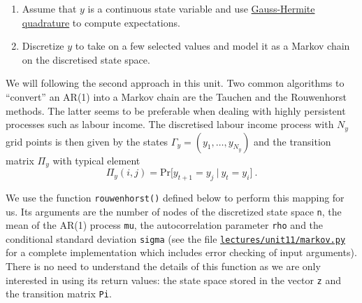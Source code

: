 \documentclass{scrartcl}
\providecommand{\tightlist}{%
      \setlength{\itemsep}{0pt}\setlength{\parskip}{0pt}}
\begin{document}
\begin{enumerate}
\def\labelenumi{\arabic{enumi}.}
\tightlist
\item
  Assume that \(y\) is a continuous state variable and use
  \href{https://en.wikipedia.org/wiki/Gauss\%E2\%80\%93Hermite_quadrature}{Gauss-Hermite
  quadrature} to compute expectations.
\item
  Discretize \(y\) to take on a few selected values and model it as a
  Markov chain on the discretised state space.
\end{enumerate}

We will following the second approach in this unit. Two common
algorithms to ``convert'' an AR(1) into a Markov chain are the Tauchen
and the Rouwenhorst methods. The latter seems to be preferable when
dealing with highly persistent processes such as labour income. The
discretised labour income process with \(N_y\) grid points is then given
by the states \(\Gamma_y = (y_1,\dots,y_{N_y})\) and the transition
matrix \(\Pi_y\) with typical element \[
\Pi_y(i,j) = \text{Pr}\bigl[y_{t+1} = y_j~|~y_t = y_i\bigr]~.
\]

We use the function \texttt{rouwenhorst()} defined below to perform this
mapping for us. Its arguments are the number of nodes of the discretized
state space \texttt{n}, the mean of the AR(1) process \texttt{mu}, the
autocorrelation parameter \texttt{rho} and the conditional standard
deviation \texttt{sigma} (see the file
\href{../lectures/unit11/markov.py}{\texttt{lectures/unit11/markov.py}}
for a complete implementation which includes error checking of input
arguments). There is no need to understand the details of this function
as we are only interested in using its return values: the state space
stored in the vector \texttt{z} and the transition matrix \texttt{Pi}.
\end{document}
